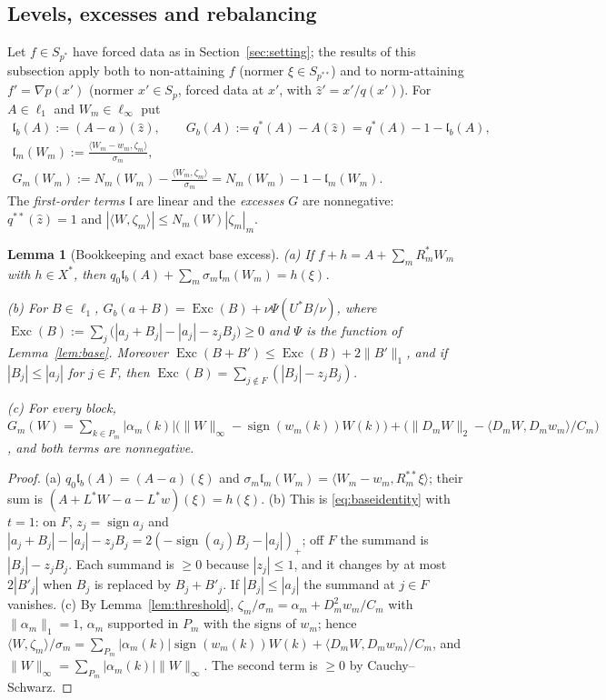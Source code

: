 \documentclass[10pt]{amsart}
\newtheorem{lemma}[theorem]{Lemma}
\theoremstyle{definition}
\theoremstyle{remark}
\newcommand{\sgn}{\operatorname{sign}}
\newcommand{\zh}{\hat z}
\newcommand{\ip}[2]{\langle #1,#2\rangle}
\newcommand{\lin}{\mathfrak l}
\newcommand{\Exc}{\operatorname{Exc}}
\begin{document}
\subsection{Levels, excesses and rebalancing}
Let $f\in S_{p^*}$ have forced data as in Section~\ref{sec:setting}; the
results of this subsection apply both to non-attaining $f$ (normer
$\xi\in S_{p^{**}}$) and to norm-attaining $f'=\nabla p(x')$ (normer
$x'\in S_p$, forced data at $x'$, with $\zh'=x'/q(x')$).  For $A\in\ell_1$
and $W_m\in\ell_\infty$ put
\begin{gather*}
 \lin_b(A):=(A-a)(\zh),\qquad G_b(A):=q^*(A)-A(\zh)=q^*(A)-1-\lin_b(A),\\
 \lin_m(W_m):=\frac{\ip{W_m-w_m}{\zeta_m}}{\sigma_m},\\
 G_m(W_m):=N_m(W_m)-\frac{\ip{W_m}{\zeta_m}}{\sigma_m}
 =N_m(W_m)-1-\lin_m(W_m).
\end{gather*}
The \emph{first-order terms} $\lin$ are linear and the \emph{excesses} $G$
are nonnegative: $q^{**}(\zh)=1$ and $|\ip{W}{\zeta_m}|\le
N_m(W)|\zeta_m|_m$.

\begin{lemma}[Bookkeeping and exact base excess]\label{lem:bookkeeping}
\textup{(a)} If $f+h=A+\sum_mR_m^*W_m$ with $h\in X^*$, then
$q_0\lin_b(A)+\sum_m\sigma_m\lin_m(W_m)=h(\xi)$.

\textup{(b)} For $B\in\ell_1$,
$G_b(a+B)=\Exc(B)+\nu\Psi(U^*B/\nu)$, where
$\Exc(B):=\sum_j\big(|a_j+B_j|-|a_j|-z_jB_j\big)\ge0$ and $\Psi$ is the
function of Lemma~\ref{lem:base}.  Moreover $\Exc(B+B')\le\Exc(B)+
2\|B'\|_1$, and if $|B_j|\le|a_j|$ for $j\in F$, then
$\Exc(B)=\sum_{j\notin F}(|B_j|-z_jB_j)$.

\textup{(c)} For every block, $G_m(W)=\sum_{k\in P_m}|\alpha_m(k)|
\big(\|W\|_\infty-\sgn(w_m(k))W(k)\big)+\big(\|D_mW\|_2-\ip{D_mW}{D_mw_m}/C_m
\big)$, and both terms are nonnegative.
\end{lemma}

\begin{proof}
(a) $q_0\lin_b(A)=(A-a)(\xi)$ and $\sigma_m\lin_m(W_m)=\ip{W_m-w_m}
{R_m^{**}\xi}$; their sum is $(A+L^*W-a-L^*w)(\xi)=h(\xi)$.
(b) This is \eqref{eq:baseidentity} with $t=1$: on $F$, $z_j=\sgn a_j$ and
$|a_j+B_j|-|a_j|-z_jB_j=2(-\sgn(a_j)B_j-|a_j|)_+$; off $F$ the summand is
$|B_j|-z_jB_j$.  Each summand is $\ge0$ because $|z_j|\le1$, and it changes
by at most $2|B'_j|$ when $B_j$ is replaced by $B_j+B'_j$.  If $|B_j|\le|a_j|$
the summand at $j\in F$ vanishes.
(c) By Lemma~\ref{lem:threshold}, $\zeta_m/\sigma_m=\alpha_m+D_m^2w_m/C_m$
with $\|\alpha_m\|_1=1$, $\alpha_m$ supported in $P_m$ with the signs of
$w_m$; hence $\ip{W}{\zeta_m}/\sigma_m=\sum_{P_m}|\alpha_m(k)|\sgn(w_m(k))
W(k)+\ip{D_mW}{D_mw_m}/C_m$, and $\|W\|_\infty=\sum_{P_m}|\alpha_m(k)|
\|W\|_\infty$.  The second term is $\ge0$ by Cauchy--Schwarz.
\end{proof}
\end{document}
